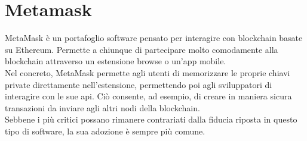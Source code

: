\section{Metamask}
\label{sec:metamask}
MetaMask è un portafoglio software pensato per interagire con blockchain basate su Ethereum.
Permette a chiunque di partecipare molto comodamente alla blockchain attraverso un estensione browse o un'app mobile. \\
Nel concreto, MetaMask permette agli utenti di memorizzare le proprie chiavi private direttamente nell'estensione,
permettendo poi agli sviluppatori di interagire con le sue \gls{api}.
Ciò consente, ad esempio, di creare in maniera sicura transazioni da inviare agli altri nodi della blockchain. \\
Sebbene i più critici possano rimanere contrariati dalla fiducia riposta in questo tipo di software, la sua adozione
è sempre più comune.